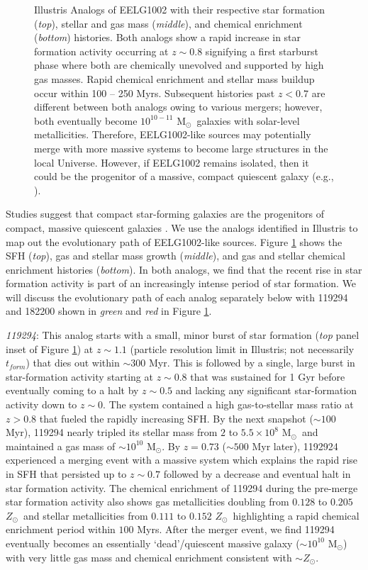 \documentclass[twocolumn,tight,times,linenumbers]{aastex631}
\newcommand{\msol}{M$_\odot$}
\newcommand{\zsol}{$Z_\odot$}
\begin{document}
\begin{figure}
		\caption{Illustris Analogs of EELG1002 with their respective star formation (\textit{top}), stellar and gas mass (\textit{middle}), and chemical enrichment (\textit{bottom}) histories. Both analogs show a rapid increase in star formation activity occurring at $z \sim 0.8$ signifying a first starburst phase where both are chemically unevolved and supported by high gas masses. Rapid chemical enrichment and stellar mass buildup occur within 100 -- 250 Myrs. Subsequent histories past $z < 0.7$ are different between both analogs owing to various mergers; however, both eventually become $10^{10 - 11}$ \msol~galaxies with solar-level metallicities. Therefore, EELG1002-like sources may potentially merge with more massive systems to become large structures in the local Universe. However, if EELG1002 remains isolated, then it could be the progenitor of a massive, compact quiescent galaxy (e.g., \citealt{Barro2013,Zolotov2015}).}
			\label{fig:analogs}
		\end{figure}
		
		Studies suggest that compact star-forming galaxies are the progenitors of compact, massive quiescent galaxies \citep{Barro2013,Zolotov2015}. We use the analogs identified in Illustris to map out the evolutionary path of EELG1002-like sources. Figure \ref{fig:analogs} shows the SFH (\textit{top}), gas and stellar mass growth (\textit{middle}), and gas and stellar chemical enrichment histories (\textit{bottom}). In both analogs, we find that the recent rise in star formation activity is part of an increasingly intense period of star formation. We will discuss the evolutionary path of each analog separately below with 119294 and 182200 shown in \textit{green} and \textit{red} in Figure \ref{fig:analogs}.
		
		
		\textit{119294}: This analog starts with a small, minor burst of star formation (\textit{top} panel inset of Figure \ref{fig:analogs}) at $z \sim 1.1$ (particle resolution limit in Illustris; not necessarily $t_{form}$) that dies out within $\sim 300$ Myr. This is followed by a single, large burst in star-formation activity starting at $z \sim 0.8$ that was sustained for 1 Gyr before eventually coming to a halt by $z \sim 0.5$ and lacking any significant star-formation activity down to $z \sim 0$. The system contained a high gas-to-stellar mass ratio at $z > 0.8$ that fueled the rapidly increasing SFH. By the next snapshot ($\sim 100$ Myr), 119294 nearly tripled its stellar mass from $2$ to $5.5 \times 10^8$ \msol~and maintained a gas mass of $\sim 10^{10}$ \msol. By $z = 0.73$ ($\sim 500$ Myr later), 1192924 experienced a merging event with a massive system which explains the rapid rise in SFH that persisted up to $z\sim 0.7$ followed by a decrease and eventual halt in star formation activity. The chemical enrichment of 119294 during the pre-merge star formation activity also shows gas metallicities doubling from $0.128$ to $0.205$ \zsol~and stellar metallicities from $0.111$ to $0.152$ \zsol~highlighting a rapid chemical enrichment period within $100$ Myrs. After the merger event, we find 119294 eventually becomes an essentially `dead'/quiescent massive galaxy ($\sim 10^{10}$ \msol) with very little gas mass and chemical enrichment consistent with $\sim \textrm{\zsol}$.
		
\end{document}
